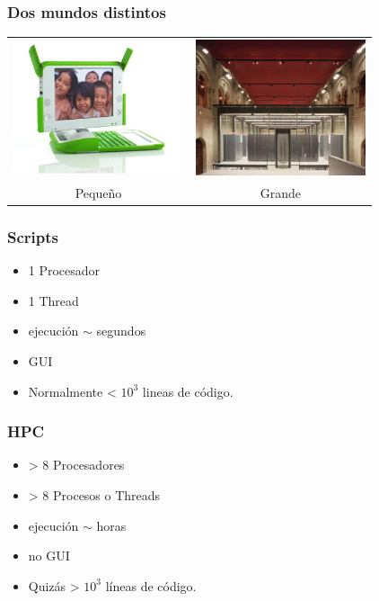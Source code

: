 \documentclass{beamer}
\begin{document}
\begin{frame}
  \frametitle{Dos mundos distintos}
  \begin{center}
    \begin{tabular}[h]{cc}
      \includegraphics[width=5cm]{files/nigerian-machine.jpg} &
      \includegraphics[width=5cm]{files/marenostrum.jpg}\\
      Pequeño & Grande
    \end{tabular}
  \end{center}
\end{frame}

\begin{frame}
  \frametitle{Scripts}
  \begin{itemize}
  \item 1 Procesador
  \item 1 Thread
  \item ejecución $\sim$ segundos
  \item GUI
  \item Normalmente < $10^3$ lineas de código.
  \end{itemize}
\end{frame}

\begin{frame}
  \frametitle{HPC}
  \begin{itemize}
  \item > 8 Procesadores
  \item > 8 Procesos o Threads
  \item ejecución $\sim$ horas
  \item no GUI
  \item Quizás > $10^3$ líneas de código.
  \end{itemize}
\end{frame}
\end{document}
